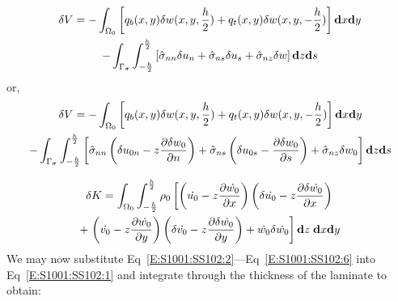 \documentclass[11pt,letterpaper,titlepage,draft]{article}
\newcommand{\diff}{\textbf d}
\newcommand{\PDer}[2]{\frac{\partial #1}{\partial #2}}
\numberwithin{equation}{subsection}
\begin{document}
\begin{multline}\label{E:S1001:SS102:4}
    \delta V = -\int_{\Omega_0} \left[ q_b(x,y) \delta w(x,y,\frac{h}{2}) + q_t(x,y) \delta w(x,y,-\frac{h}{2}) \right] \diff{x} \diff{y} \\
    - \int_{\Gamma_{\sigma}} \int_{-\frac{h}{2}}^{\frac{h}{2}} \left[ 
    \hat{\sigma}_{nn} \delta u_n +  \hat{\sigma}_{ns} \delta u_s +\hat{\sigma}_{nz} \delta w    
    \right] \diff{z} \diff{s} 
\end{multline}
or,
\begin{multline}\label{E:S1001:SS102:5}
    \delta V  = -\int_{\Omega_0} \left[ q_b(x,y) \delta w(x,y,\frac{h}{2}) + q_t(x,y) \delta w(x,y,-\frac{h}{2}) \right] \diff{x} \diff{y} \\
    - \int_{\Gamma_{\sigma}} \int_{-\frac{h}{2}}^{\frac{h}{2}} \left[ 
       \hat{\sigma}_{nn} \left( \delta u_{0n} - z \PDer{\delta w_0}{n} \right) 
     + \hat{\sigma}_{ns} \left(\delta u_{0s} - \PDer{\delta w_0}{s} \right) 
     + \hat{\sigma}_{nz} \delta w_0 
    \right] \diff{z} \diff{s}
\end{multline}

\begin{multline}\label{E:S1001:SS102:6}
    \delta K=\int_{\Omega_0} \int_{-\frac{h}{2}}^{\frac{h}{2}} \rho_{0} \left[ \left( \dot{u_0} - z \PDer{\dot{w_0}}{x} \right) \left(\delta \dot{u_0} - z \PDer{\delta \dot{w_0}}{x} \right) \right.\\
    + \left.\left( \dot{v_0} - z \PDer{\dot{w_0}}{y} \right) \left(\delta \dot{v_0} - z \PDer{\delta \dot{w_0}}{y} \right) + \dot{w_0}\delta \dot{w_0} \right]
 \diff{z} \; \diff{x}\diff{y}
\end{multline}
We may now substitute Eq~\ref{E:S1001:SS102:2}---Eq~\ref{E:S1001:SS102:6} into Eq~\ref{E:S1001:SS102:1}
and integrate through the thickness of the laminate to obtain:
\end{document}
